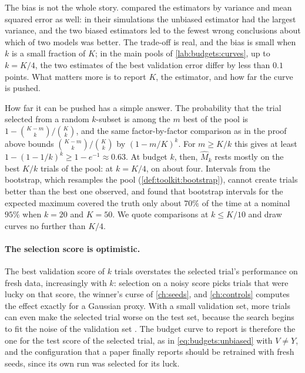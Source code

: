\begin{refsection}
The bias is not the whole story. \Textcite{DodgeEtAl2021} compared the estimators by variance and mean squared error as well: in their simulations the unbiased estimator had the largest variance, and the two biased estimators led to the fewest wrong conclusions about which of two models was better. The trade-off is real, and the bias is small when $k$ is a small fraction of $K$; in the main pools of \cref{lab:budgets:curves}, up to $k=K/4$, the two estimates of the best validation error differ by less than $0.1$ points. What matters more is to report $K$, the estimator, and how far the curve is pushed.

How far it can be pushed has a simple answer. The probability that the trial selected from a random $k$-subset is among the $m$ best of the pool is $1-\binom{K-m}k/\binom Kk$, and the same factor-by-factor comparison as in the proof above bounds $\binom{K-m}k/\binom Kk$ by $(1-m/K)^k$. For $m\ge K/k$ this gives at least $1-(1-1/k)^k\ge1-e^{-1}\approx0.63$. At budget $k$, then, $\hat M_k$ rests mostly on the best $K/k$ trials of the pool: at $k=K/4$, on about four. Intervals from the bootstrap, which resamples the pool (\cref{def:toolkit:bootstrap}), cannot create trials better than the best one observed, and \textcite{TangEtAl2020} found that bootstrap intervals for the expected maximum covered the truth only about $70\%$ of the time at a nominal $95\%$ when $k=20$ and $K=50$. We quote comparisons at $k\le K/10$ and draw curves no further than $K/4$.

\paragraph{The selection score is optimistic.} The best validation score of $k$ trials overstates the selected trial's performance on fresh data, increasingly with $k$: selection on a noisy score picks trials that were lucky on that score, the winner's curse of \cref{ch:seeds}, and \cref{ch:controls} computes the effect exactly for a Gaussian proxy. With a small validation set, more trials can even make the selected trial worse on the test set, because the search begins to fit the noise of the validation set \parencite{CawleyTalbot2010}. The budget curve to report is therefore the one for the test score of the selected trial, as in \eqref{eq:budgets:unbiased} with $V\ne Y$, and the configuration that a paper finally reports should be retrained with fresh seeds, since its own run was selected for its luck.


\end{refsection}
